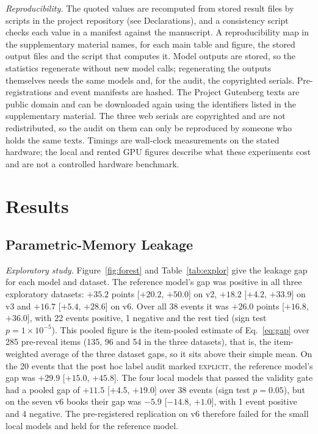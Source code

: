\documentclass[sn-mathphys]{sn-jnl}%
\theoremstyle{thmstyleone}%
\theoremstyle{thmstyletwo}%
\theoremstyle{thmstylethree}%
\begin{document}
\emph{Reproducibility.} The quoted values are recomputed from stored result files by scripts in the project repository (see Declarations), and a consistency script checks each value in a manifest against the manuscript. A reproducibility map in the supplementary material names, for each main table and figure, the stored output files and the script that computes it. Model outputs are stored, so the statistics regenerate without new model calls; regenerating the outputs themselves needs the same models and, for the audit, the copyrighted serials. Pre-registrations and event manifests are hashed. The Project Gutenberg texts are public domain and can be downloaded again using the identifiers listed in the supplementary material. The three web serials are copyrighted and are not redistributed, so the audit on them can only be reproduced by someone who holds the same texts. Timings are wall-clock measurements on the stated hardware; the local and rented GPU figures describe what these experiments cost and are not a controlled hardware benchmark.

\section{Results}\label{sec:results}

\subsection{Parametric-Memory Leakage}\label{sec:r-memory}

\emph{Exploratory study.} Figure~\ref{fig:forest} and Table~\ref{tab:explor} give the leakage gap for each model and dataset. The reference model's gap was positive in all three exploratory datasets: $+35.2$ points [$+20.2$, $+50.0$] on v2, $+18.2$ [$+4.2$, $+33.9$] on v3 and $+16.7$ [$+5.4$, $+28.6$] on v6. Over all 38 events it was $+26.0$ points [$+16.8$, $+36.0$], with 22 events positive, 1 negative and the rest tied (sign test $p=1\times10^{-5}$). This pooled figure is the item-pooled estimate of Eq.~\eqref{eq:gap} over 285 pre-reveal items (135, 96 and 54 in the three datasets), that is, the item-weighted average of the three dataset gaps, so it sits above their simple mean. On the 20 events that the post hoc label audit marked \textsc{explicit}, the reference model's gap was $+29.9$ [$+15.0$, $+45.8$]. The four local models that passed the validity gate had a pooled gap of $+11.5$ [$+4.5$, $+19.0$] over 38 events (sign test $p=0.05$), but on the seven v6 books their gap was $-5.9$ [$-14.8$, $+1.0$], with 1 event positive and 4 negative. The pre-registered replication on v6 therefore failed for the small local models and held for the reference model.
\end{document}
